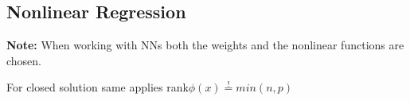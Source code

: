 \subsection{Nonlinear Regression}

\textbf{Note: } When working with NNs both the weights and the nonlinear functions are chosen.

For closed solution same applies rank$\phi(x) \overset{!}{=} min(n,p)$